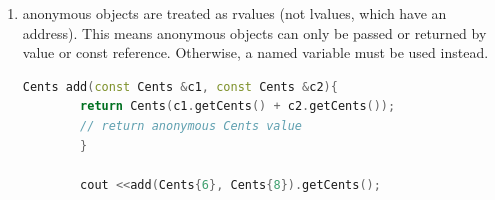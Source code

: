 \documentclass[a4paper,12pt,twoside]{book}
\begin{document}
\begin{itemize}
\begin{enumerate}
		\item anonymous objects are treated as rvalues (not lvalues, which have an address). This means anonymous objects can only be passed or returned by value or const reference. Otherwise, a named variable must be used instead.
		
		\begin{lstlisting}[frame=single, language=c++]
		Cents add(const Cents &c1, const Cents &c2){
		return Cents(c1.getCents() + c2.getCents());
		// return anonymous Cents value
		}
		
		cout <<add(Cents{6}, Cents{8}).getCents();
		\end{lstlisting}
		
	\end{enumerate}
	
\end{itemize}
\end{document}

